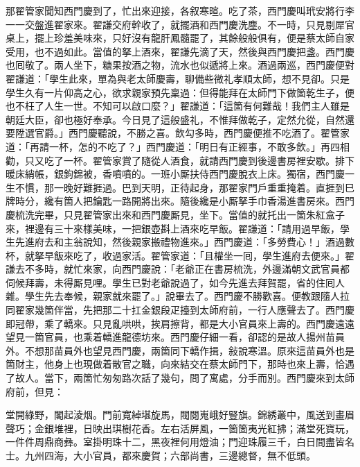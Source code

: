 那翟管家聞知西門慶到了，忙出來迎接，各叙寒暄。吃了茶，西門慶叫玳安將行李一一交盤進翟家來。翟謙交府幹收了，就擺酒和西門慶洗塵。不一時，只見剔犀官桌上，擺上珍羞美味來，只好沒有龍肝鳳髓罷了，其餘般般俱有，便是蔡太師自家受用，也不過如此。當值的拏上酒來，翟謙先滴了天，然後與西門慶把盞。西門慶也囘敬了。兩人坐下，糖果按酒之物，流水也似遞將上來。酒過兩巡，西門慶便對翟謙道：「學生此來，單為與老太師慶壽，聊備些微礼孝順太師，想不見卻。只是學生久有一片仰高之心，欲求親家預先稟過：但得能拜在太師門下做箇乾生子，便也不枉了人生一世。{}不知可以啟口麼？」翟謙道：「這箇有何難哉！我們主人雖是朝廷大臣，卻也極好奉承。今日見了這般盛礼，不惟拜做乾子，定然允從，自然還要陞選官爵。」{}西門慶聽說，不勝之喜。飲勾多時，西門慶便推不吃酒了。翟管家道：「再請一杯，怎的不吃了？」西門慶道：「明日有正經事，不敢多飲。」再四相勸，只又吃了一杯。翟管家賞了隨從人酒食，就請西門慶到後邊書房裡安歇。排下暖床綃帳，銀鉤錦被，香噴噴的。一班小厮扶侍西門慶脫衣上床。獨宿，西門慶一生不慣，那一晚好難捱過。巴到天明，正待起身，那翟家門戶重重掩着。直捱到巳牌時分，纔有箇人把鑰匙一路開將出來。隨後纔是小厮拏手巾香湯進書房來。西門慶梳洗完畢，只見翟管家出來和西門慶厮見，坐下。當值的就托出一箇朱紅盒子來，裡邊有三十來樣美味，一把銀壺斟上酒來吃早飯。翟謙道：「請用過早飯，學生先進府去和主翁說知，然後親家搬禮物進來。」西門慶道：「多勞費心！」酒過數杯，就拏早飯來吃了，收過家活。翟管家道：「且權坐一囘，學生進府去便來。」翟謙去不多時，就忙來家，{}向西門慶說：「老爺正在書房梳洗，外邊滿朝文武官員都伺候拜壽，未得厮見哩。學生已對老爺說過了，如今先進去拜賀罷，省的住囘人雜。學生先去奉候，親家就來罷了。」說畢去了。西門慶不勝歡喜。便教跟隨人拉同翟家幾箇伴當，先把那二十扛金銀段疋擡到太師府前，一行人應聲去了。西門慶即冠帶，乘了轎來。只見亂哄哄，挨肩擦背，都是大小官員來上壽的。西門慶遠遠望見一箇官員，也乘着轎進龍德坊來。西門慶仔細一看，卻認的是故人揚州苗員外。不想那苗員外也望見西門慶，兩箇同下轎作揖，敍說寒溫。原來這苗員外也是箇財主，他身上也現做着散官之職，向來結交在蔡太師門下，那時也來上壽，恰遇了故人。當下，兩箇忙匆匆路次話了幾句，問了寓處，分手而別。{}西門慶來到太師府前，但見：

\begin{myquote}
堂開綠野，閣起淩烟。門前寬綽堪旋馬，閥閱嵬峨好豎旗。錦綉叢中，風送到畫眉聲巧；金銀堆裡，日映出琪樹花香。左右活屏風，一箇箇夷光紅拂；滿堂死寶玩，一件件周鼎商彝。室掛明珠十二，黑夜裡何用燈油；門迎珠履三千，白日間盡皆名士。九州四海，大小官員，都來慶賀；六部尚書，三邊總督，無不低頭。
\end{myquote}

